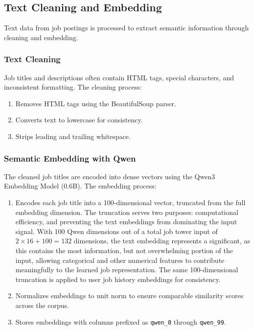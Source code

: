 \subsection{Text Cleaning and Embedding}
\label{sec:text_embedding}
Text data from job postings is processed to extract semantic information through cleaning and embedding.

\subsubsection{Text Cleaning}
Job titles and descriptions often contain HTML tags, special characters, and inconsistent formatting. The cleaning process:
\begin{enumerate}
    \item Removes HTML tags using the BeautifulSoup parser.
    \item Converts text to lowercase for consistency.
    \item Strips leading and trailing whitespace.
\end{enumerate}

\subsubsection{Semantic Embedding with Qwen}
The cleaned job titles are encoded into dense vectors using the Qwen3 Embedding Model (0.6B). The embedding process:
\begin{enumerate}
    \item Encodes each job title into a 100-dimensional vector, truncated from the full embedding dimension. The truncation serves two purposes: computational efficiency, and preventing the text embeddings from dominating the input signal. 
    With 100 Qwen dimensions out of a total job tower input of $2 \times 16 + 100 = 132$ dimensions, the text embedding represents a significant, as this contains the most information, but not overwhelming portion of the input, allowing categorical and other numerical features to contribute meaningfully to the learned job representation. The same 100-dimensional truncation is applied to user job history embeddings for consistency.
    \item Normalizes embeddings to unit norm to ensure comparable similarity scores across the corpus.
    \item Stores embeddings with columns prefixed as \texttt{qwen\_0} through \texttt{qwen\_99}.
\end{enumerate}

